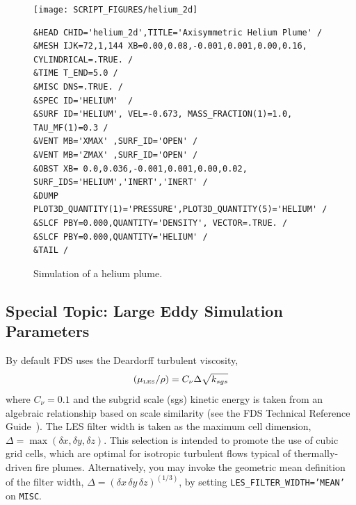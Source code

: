 \documentclass[11pt]{book}
\newcommand{\ct}{\tt\small}
\begin{document}
\begin{figure}[ht]
\scriptsize
\noindent
\begin{minipage}{1.1in}
\texttt{[image: SCRIPT\_FIGURES/helium\_2d]}
\end{minipage}
\hfill
\begin{minipage}{5.5in}
\begin{verbatim}
&HEAD CHID='helium_2d',TITLE='Axisymmetric Helium Plume' /
&MESH IJK=72,1,144 XB=0.00,0.08,-0.001,0.001,0.00,0.16, CYLINDRICAL=.TRUE. /
&TIME T_END=5.0 /
&MISC DNS=.TRUE. /
&SPEC ID='HELIUM'  /
&SURF ID='HELIUM', VEL=-0.673, MASS_FRACTION(1)=1.0, TAU_MF(1)=0.3 /
&VENT MB='XMAX' ,SURF_ID='OPEN' /
&VENT MB='ZMAX' ,SURF_ID='OPEN' /
&OBST XB= 0.0,0.036,-0.001,0.001,0.00,0.02, SURF_IDS='HELIUM','INERT','INERT' /
&DUMP PLOT3D_QUANTITY(1)='PRESSURE',PLOT3D_QUANTITY(5)='HELIUM' /
&SLCF PBY=0.000,QUANTITY='DENSITY', VECTOR=.TRUE. /
&SLCF PBY=0.000,QUANTITY='HELIUM' /
&TAIL /
\end{verbatim}
\end{minipage}
\normalsize
\caption[Snapshot of the {\ct helium\_2d} test case]{Simulation of a helium plume.}
\label{helium_plume}
\end{figure}

\subsection{Special Topic: Large Eddy Simulation Parameters}
\label{info:LES}

By default FDS uses the Deardorff \cite{Deardorff:1980,Pope:2000} turbulent viscosity,
\begin{equation}
(\mu_{\hbox{\tiny LES}}/\rho) = C_\nu \Delta \sqrt{k_{sgs}}
\end{equation}
where $C_\nu=0.1$ and the subgrid scale (sgs) kinetic energy is taken from an algebraic relationship based on scale similarity (see the FDS Technical Reference Guide~\cite{FDS_Math_Guide}). The LES filter width is taken as the maximum cell dimension, $\Delta = \max(\delta x,\delta y,\delta z)$.  This selection is intended to promote the use of cubic grid cells, which are optimal for isotropic turbulent flows typical of thermally-driven fire plumes.  Alternatively, you may invoke the geometric mean definition of the filter width, $\Delta = (\delta x\, \delta y\, \delta z)^{(1/3)}$, by setting {\ct LES\_FILTER\_WIDTH='MEAN'} on {\ct MISC}.
\end{document}
